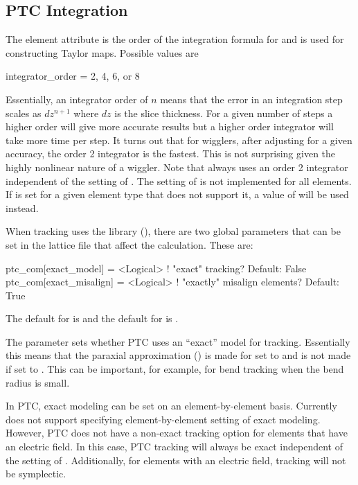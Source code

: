 \subsection{PTC Integration}
\label{s:ptc.integ}

The  element attribute is the order of the integration formula for
 and is used for constructing Taylor maps. Possible values are
\begin{example}
  integrator_order = 2, 4, 6, or 8
\end{example}
Essentially, an integrator order of $n$ means that the error in an integration step scales as
$dz^{n+1}$ where $dz$ is the slice thickness. For a given number of steps a higher order will give
more accurate results but a higher order integrator will take more time per step. It turns out that
for wigglers, after adjusting  for a given accuracy, the order 2 integrator is the
fastest. This is not surprising given the highly nonlinear nature of a wiggler. Note that
 always uses an order 2 integrator independent of the setting of
. The setting of  is not implemented for all elements. If  is set
for a given element type that does not support it, a value of  will be used instead.

When tracking uses the  library (), there are two global parameters that
can be set in the lattice file that affect the calculation. These are:
\begin{example}
  ptc_com[exact_model]    = <Logical>  ! "exact" tracking? Default: False
  ptc_com[exact_misalign] = <Logical>  ! "exactly" misalign elements? Default: True
\end{example}
The default for  is  and the default for  is .

The  parameter sets whether PTC uses an ``exact'' model for
tracking. Essentially this means that the paraxial approximation () is made
for  set to  and is not made if set to . This can be
important, for example, for bend tracking when the bend radius is small.

In PTC, exact modeling can be set on an element-by-element basis. Currently \bmad does not support
specifying element-by-element setting of exact modeling. However, PTC does not have a non-exact
tracking option for elements that have an electric field. In this case, PTC tracking will always be
exact independent of the setting of .  Additionally, for elements with an
electric field, tracking will not be symplectic.

